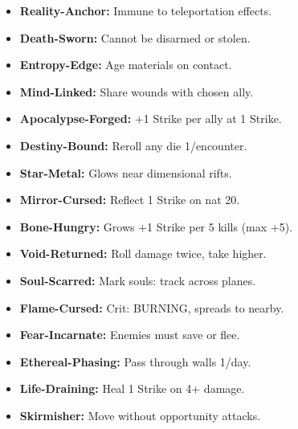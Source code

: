 \documentclass[10pt,twoside]{article}
\begin{document}
\hfill
\begin{minipage}[t]{0.48\textwidth}
\begin{itemize}[leftmargin=0.3cm, itemsep=0.1cm]
\item \textcolor{veryrarecolor}{\textbf{Reality-Anchor:}} \textcolor{veryrarecolor}{Immune to teleportation effects.}
\item \textcolor{veryrarecolor}{\textbf{Death-Sworn:}} \textcolor{veryrarecolor}{Cannot be disarmed or stolen.}
\item \textcolor{veryrarecolor}{\textbf{Entropy-Edge:}} \textcolor{veryrarecolor}{Age materials on contact.}
\item \textcolor{veryrarecolor}{\textbf{Mind-Linked:}} \textcolor{veryrarecolor}{Share wounds with chosen ally.}
\item \textcolor{veryrarecolor}{\textbf{Apocalypse-Forged:}} \textcolor{veryrarecolor}{+1 Strike per ally at 1 Strike.}
\item \textcolor{veryrarecolor}{\textbf{Destiny-Bound:}} \textcolor{veryrarecolor}{Reroll any die 1/encounter.}
\item \textcolor{veryrarecolor}{\textbf{Star-Metal:}} \textcolor{veryrarecolor}{Glows near dimensional rifts.}
\item \textcolor{veryrarecolor}{\textbf{Mirror-Cursed:}} \textcolor{veryrarecolor}{Reflect 1 Strike on nat 20.}
\item \textcolor{veryrarecolor}{\textbf{Bone-Hungry:}} \textcolor{veryrarecolor}{Grows +1 Strike per 5 kills (max +5).}
\item \textcolor{veryrarecolor}{\textbf{Void-Returned:}} \textcolor{veryrarecolor}{Roll damage twice, take higher.}
\item \textcolor{veryrarecolor}{\textbf{Soul-Scarred:}} \textcolor{veryrarecolor}{Mark souls: track across planes.}
\item \textcolor{veryrarecolor}{\textbf{Flame-Cursed:}} \textcolor{veryrarecolor}{Crit: BURNING, spreads to nearby.}
\item \textcolor{veryrarecolor}{\textbf{Fear-Incarnate:}} \textcolor{veryrarecolor}{Enemies must save or flee.}
\item \textcolor{veryrarecolor}{\textbf{Ethereal-Phasing:}} \textcolor{veryrarecolor}{Pass through walls 1/day.}
\item \textcolor{veryrarecolor}{\textbf{Life-Draining:}} \textcolor{veryrarecolor}{Heal 1 Strike on 4+ damage.}
\item \textcolor{veryrarecolor}{\textbf{Skirmisher:}} \textcolor{veryrarecolor}{Move without opportunity attacks.}
\end{itemize}
\end{minipage}
\end{document}
